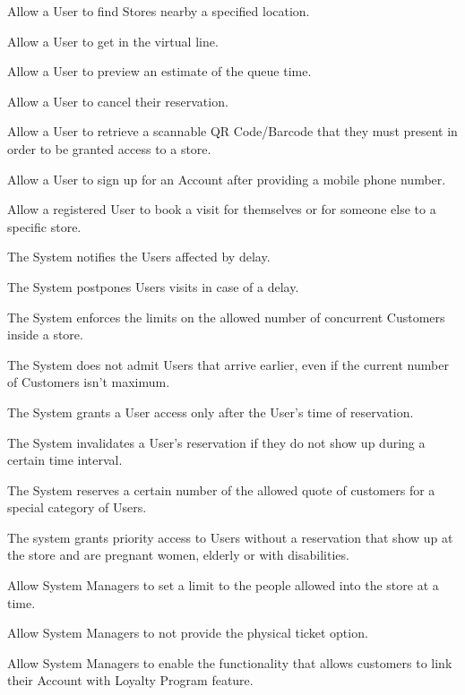 \begin{enumerate}[label={[R\arabic*]}]
    \item Allow a User to find Stores nearby a specified location.
    \item Allow a User to get in the virtual line.
    \item Allow a User to preview an estimate of the queue time.
    \item Allow a User to cancel their reservation.
    \item Allow a User to retrieve a scannable QR Code/Barcode that they must present in order to be granted access to a store.
    \item Allow a User to sign up for an Account after providing a mobile phone number.
    \item Allow a registered User to book a visit for themselves or for someone else to a specific store.

    \item The System notifies the Users affected by delay.
    \item The System postpones Users visits in case of a delay.
    \item The System enforces the limits on the allowed number of concurrent Customers inside a store.
    \item The System does not admit Users that arrive earlier, even if the current number of Customers isn't maximum.
    \item The System grants a User access only after the User's time of reservation.
    \item The System invalidates a User's reservation if they do not show up during a certain time interval.
    \item The System reserves a certain number of the allowed quote of customers for a special category of Users.
    \item The system grants priority access to Users without a reservation that show up at the store and are pregnant women, elderly or with disabilities.
    
    \item Allow System Managers to set a limit to the people allowed into the store at a time.
    \item Allow System Managers to not provide the physical ticket option.
    \item Allow System Managers to enable the functionality that allows customers to link their Account with Loyalty Program feature.
\end{enumerate}

